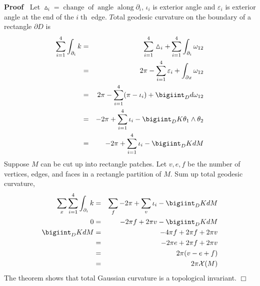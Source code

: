 \documentclass{article}
\newcommand{\tmop}[1]{\ensuremath{\operatorname{#1}}}
\newenvironment{proof}{\noindent\textbf{Proof\ }}{\hspace*{\fill}$\Box$\medskip}
\begin{document}
\begin{proof}
  Let $\vartriangle_i = \tmop{change} \tmop{of} \tmop{angle} \tmop{along}
  \partial_i$, $\iota_i$ is exterior angle and $\varepsilon_i$ is exterior
  angle at the end of the $i \tmop{th}$ edge. $T$otal geodesic curvature on
  the boundary of a rectangle $\partial D$ is
  \begin{eqnarray*}
    \sum_{i = 1}^4 \int_{\partial_i} k & = & \sum_{i = 1}^4 \vartriangle_i +
    \sum_{i = 1}^4 \int_{\partial_i} \omega_{12}\\
    & = & 2 \pi - \sum_{i = 1}^4 \varepsilon_i + \int_{\partial x}
    \omega_{12}\\
    & = & 2 \pi - \sum_{i = 1}^4 (\pi - \iota_i) + \bigiint_D d \omega_{12}\\
    & = & - 2 \pi + \sum_{i = 1}^4 \iota_i - \bigiint_D K \theta_1 \wedge
    \theta_2\\
    & = & - 2 \pi + \sum_{i = 1}^4 \iota_i - \bigiint_D K d M
  \end{eqnarray*}
  Suppose $M$ can be cut up into rectangle patches. Let $v, e, f$ be the
  number of vertices, edges, and faces in a rectangle partition of $M$. Sum up
  total geodesic curvature,
  \begin{eqnarray*}
    \sum_x \sum_{i = 1}^4 \int_{\partial_i} k & = & \sum_f - 2 \pi + \sum_v
    \iota_i - \bigiint_D K d M\\
    0 & = & - 2 \pi f + 2 \pi v - \bigiint_D K d M\\
    \bigiint_D K d M & = & - 4 \pi f + 2 \pi f + 2 \pi v\\
    & = & - 2 \pi e + 2 \pi f + 2 \pi v\\
    & = & 2 \pi (v - e + f)\\
    & = & 2 \pi \mathcal{X} (M)
  \end{eqnarray*}
  The theorem shows that total Gaussian curvature is a topological invariant.
\end{proof}

{}
\end{document}
